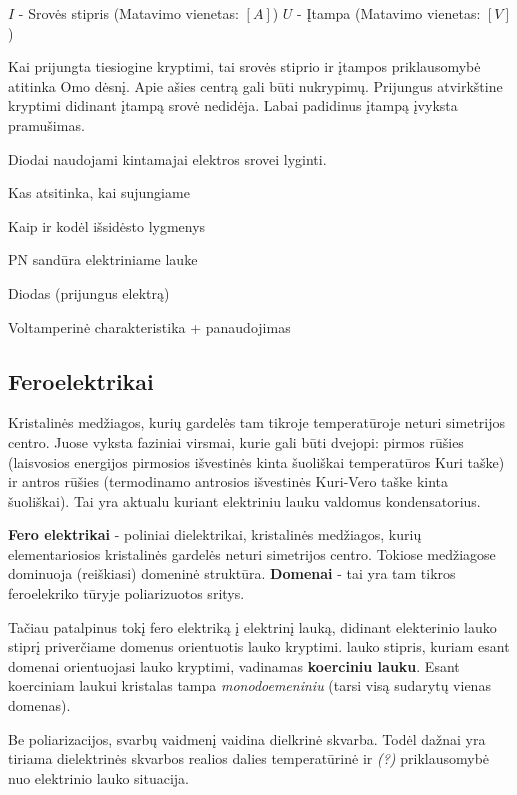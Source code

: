 $I$ - Srovės stipris (Matavimo vienetas: $[A]$)
$U$ - Įtampa (Matavimo vienetas: $[V]$)

Kai prijungta tiesiogine kryptimi, tai srovės stiprio ir įtampos priklausomybė
atitinka Omo dėsnį. Apie ašies centrą gali būti nukrypimų.
Prijungus atvirkštine kryptimi didinant įtampą srovė nedidėja.
Labai padidinus įtampą įvyksta pramušimas.

Diodai naudojami kintamajai elektros srovei lyginti.

\begin{remember}
  \item Kas atsitinka, kai sujungiame
  \item Kaip ir kodėl išsidėsto lygmenys
  \item PN sandūra elektriniame lauke
  \item Diodas (prijungus elektrą)
  \item Voltamperinė charakteristika + panaudojimas
\end{remember}




\subsection{Feroelektrikai}
Kristalinės medžiagos, kurių gardelės tam tikroje temperatūroje neturi
simetrijos centro. Juose vyksta faziniai virsmai, kurie gali būti
dvejopi: pirmos rūšies (laisvosios energijos pirmosios išvestinės
kinta šuoliškai temperatūros Kuri taške) ir antros rūšies (termodinamo
antrosios išvestinės Kuri-Vero taške kinta šuoliškai). Tai yra
aktualu kuriant elektriniu lauku valdomus kondensatorius.

\textbf{Fero elektrikai} - poliniai dielektrikai,
kristalinės medžiagos, kurių elementariosios kristalinės gardelės neturi simetrijos centro.
Tokiose medžiagose dominuoja (reiškiasi) domeninė struktūra.
\textbf{Domenai} - tai yra tam tikros feroelekriko tūryje poliarizuotos sritys.

Tačiau patalpinus tokį fero elektriką į elektrinį lauką,
didinant elekterinio lauko stiprį priverčiame domenus orientuotis lauko kryptimi.
lauko stipris, kuriam esant domenai orientuojasi lauko kryptimi,
vadinamas \textbf{koerciniu lauku}.
Esant koerciniam laukui kristalas tampa \textit{monodoemeniniu} (tarsi visą sudarytų vienas domenas).

Be poliarizacijos, svarbų vaidmenį vaidina dielkrinė skvarba.
Todėl dažnai yra tiriama dielektrinės skvarbos realios dalies temperatūrinė ir \textit{(?)} priklausomybė nuo elektrinio lauko situacija.

